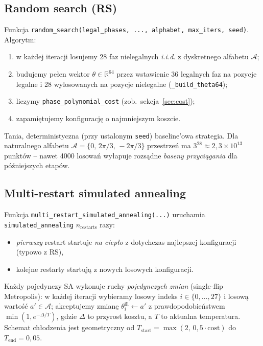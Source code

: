 \documentclass[11pt,a4paper]{article}
\newcommand{\R}{\mathbb{R}}
\newcommand{\1}{\mathbf{1}}
\newcommand{\Alphabet}{\mathcal{A}}
\newcommand{\code}[1]{\texttt{#1}}
\begin{document}
\subsection{Random search (RS)}
\label{sec:rs}

Funkcja \code{random\_search(legal\_phases, ..., alphabet, max\_iters,
seed)}. Algorytm:
\begin{enumerate}[leftmargin=*]
  \item w każdej iteracji losujemy 28 faz nielegalnych \emph{i.i.d.}
        z dyskretnego alfabetu $\Alphabet$;
  \item budujemy pełen wektor $\theta\in\R^{64}$ przez wstawienie 36
        legalnych faz na pozycje legalne i 28 wylosowanych na pozycje
        nielegalne (\code{\_build\_theta64});
  \item liczymy \code{phase\_polynomial\_cost} (zob.\
        sekcja~\ref{sec:cost});
  \item zapamiętujemy konfigurację o najmniejszym koszcie.
\end{enumerate}
Tania, deterministyczna (przy ustalonym \code{seed}) baseline'owa
strategia. Dla naturalnego alfabetu
$\Alphabet=\{0,\,2\pi/3,\,-2\pi/3\}$ przestrzeń ma $3^{28}\approx
2{,}3\times 10^{13}$ punktów -- nawet 4000 losowań wyłapuje rozsądne
\emph{baseny przyciągania} dla późniejszych etapów.

\subsection{Multi-restart simulated annealing}
\label{sec:sa}

Funkcja \code{multi\_restart\_simulated\_annealing(...)} uruchamia
\code{simulated\_annealing} $n_{\mathrm{restarts}}$ razy:
\begin{itemize}[leftmargin=*]
  \item \emph{pierwszy} restart startuje \emph{na ciepło} z dotychczas
        najlepszej konfiguracji (typowo z RS),
  \item kolejne restarty startują z nowych losowych konfiguracji.
\end{itemize}
Każdy pojedynczy SA wykonuje ruchy \emph{pojedynczych zmian} (single-flip
Metropolis): w każdej iteracji wybieramy losowy indeks $i\in\{0,\dots,27\}$
i losową wartość $a'\in\Alphabet$; akceptujemy zmianę
$\theta^{\mathrm{ill}}_{i}\leftarrow a'$ z prawdopodobieństwem
$\min(1, e^{-\Delta/T})$, gdzie $\Delta$ to przyrost kosztu, a $T$ to
aktualna temperatura. Schemat chłodzenia jest geometryczny od
$T_{\mathrm{start}}=\max(2,\,0{,}5\cdot\mathrm{cost})$ do
$T_{\mathrm{end}}=0{,}05$.
\end{document}
